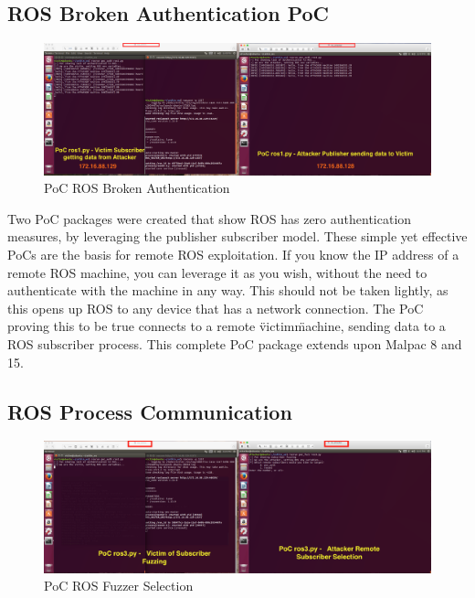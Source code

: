 \documentclass[IEEEtran,letterpaper,10pt,notitlepage,draftclsnofoot,onecolumn]{article}
\begin{document}
\subsection{ROS Broken Authentication PoC}
\begin{figure}[H]
  \centering
    \includegraphics[width=\textwidth]{poc1}
    \caption{PoC ROS Broken Authentication}
\end{figure}

Two PoC packages were created that show ROS has zero authentication measures, by leveraging the publisher subscriber model.
These simple yet effective PoCs are the basis for remote ROS exploitation. If you know the IP address of a remote ROS machine, you can leverage it as you wish, without the need
to authenticate with the machine in any way. This should not be taken lightly, as this opens up ROS to any device that has a network connection. The PoC proving this to be true
connects to a remote \"victim\" machine, sending data to a ROS subscriber process. This complete PoC package extends upon Malpac 8 and 15.

\subsection{ROS Process Communication}
\begin{figure}[H]
  \centering
    \includegraphics[width=\textwidth]{poc2}
    \caption{PoC ROS Fuzzer Selection}
\end{figure}
\end{document}
